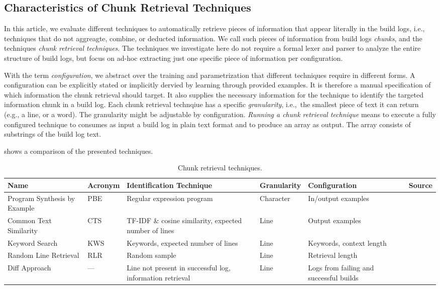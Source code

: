\subsection{Characteristics of Chunk Retrieval Techniques}
\label{sec:blirt}
In this article, we evaluate different techniques to automatically
retrieve pieces of information that appear literally in the build
logs, i.e., techniques that do not aggreagte, combine, or deducted
information.
We call such pieces of information from build logs
\emph{chunks}, and the techniques \emph{chunk retrieval techniques}.
The techniques we investigate here do not require a formal lexer and
parser to analyze the entire structure of build logs, but focus on
ad-hoc extracting just one specific piece of information per
configuration.

With the term \textit{configuration}, we abstract over the training
and parametrization that different techniques require in different
forms.
A configuration can be explicitly stated or implicitly dervied
by learning through provided examples.
It is therefore a manual
specification of which information the chunk retrieval should target.
It also supplies the necessary information for the technique to
identify the targeted information chunk in a build log.
Each chunk
retrieval technqiue has a specific \textit{granularity}, i.e.,\ the
smallest piece of text it can return (e.g., a line, or a word).
The
granularity might be adjustable by configuration.
\emph{Running a
chunk retrieval technique} means to execute a fully configured
technique to consumes as input a build log in plain text format and to
produce an array as output.
The array consists of substrings of the
build log text.

 shows a comparison of the presented techniques.

\begin{table}[]
\centering
\caption{Chunk retrieval techniques.}
\begin{tabularx}{\textwidth}{@{}XlXlXX@{}}
\toprule
Name			     & Acronym & Identification Technique
& Granularity & Configuration & Source		  \\
\midrule
Program Synthesis by Example & PBE     & Regular expression program
& Character   & In/output examples	\\
Common Text Similarity	     & CTS     & TF-IDF \& cosine similarity,
expected number of lines & Line        & Output examples	   \\
Keyword Search		     & KWS     & Keywords, expected number of
lines			 & Line        & Keywords, context length  \\
Random Line Retrieval	     & RLR     & Random sample
& Line	      & Retrieval length	  \\
Diff Approach		     & ---     & Line not present in successful
log, information retrieval  & Line	  & Logs from failing and
successful builds      \\
\bottomrule
\end{tabularx}
\label{tab:ctr}
\end{table}


